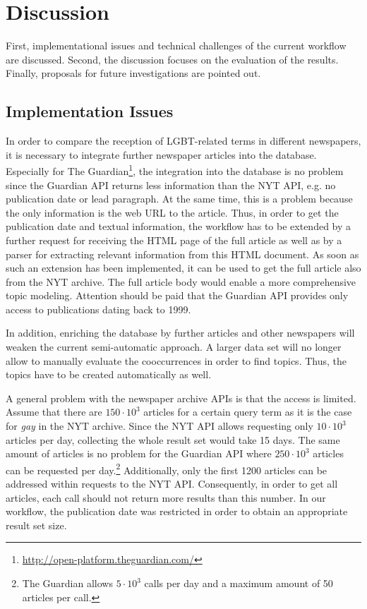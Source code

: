 \documentclass[10pt,a4paper,twocolumn]{scrartcl}
\begin{document}
\section{Discussion}
First, implementational issues and technical challenges of the current workflow are discussed. Second, the discussion focuses on the evaluation of the results. Finally, proposals for future investigations are pointed out.

\subsection{Implementation Issues}
In order to compare the reception of LGBT-related terms in different newspapers, it is necessary to integrate further newspaper articles into the database. Especially for The Guardian\footnote{\url{http://open-platform.theguardian.com/}}, the integration into the database is no problem since the Guardian API returns less information than the NYT API, e.g. no publication date or lead paragraph. At the same time, this is a problem because the only information is the web URL to the article. Thus, in order to get the publication date and textual information, the workflow has to be extended by a further request for receiving the HTML page of the full article as well as by a parser for extracting relevant information from this HTML document. As soon as such an extension has been implemented, it can be used to get the full article also from the NYT archive. The full article body would enable a more comprehensive topic modeling. Attention should be paid that the Guardian API provides only access to publications dating back to 1999.

In addition, enriching the database by further articles and other newspapers will weaken the current semi-automatic approach. A larger data set will no longer allow to manually evaluate the cooccurrences in order to find topics. Thus, the topics have to be created automatically as well.

A general problem with the newspaper archive APIs is that the access is limited. Assume that there are $150 \cdot 10^3$ articles for a certain query term as it is the case for \textit{gay} in the NYT archive. Since the NYT API allows requesting only $10\cdot 10^3$ articles per day, collecting the whole result set would take 15 days. The same amount of articles is no problem for the Guardian API where $250\cdot 10^3$ articles can be requested per day.\footnote{The Guardian allows $5\cdot 10^3$ calls per day and a maximum amount of 50 articles per call.} Additionally, only the first 1200 articles can be addressed within requests to the NYT API. Consequently, in order to get all articles, each call should not return more results than this number. In our workflow, the publication date was restricted in order to obtain an appropriate result set size.
\end{document}
